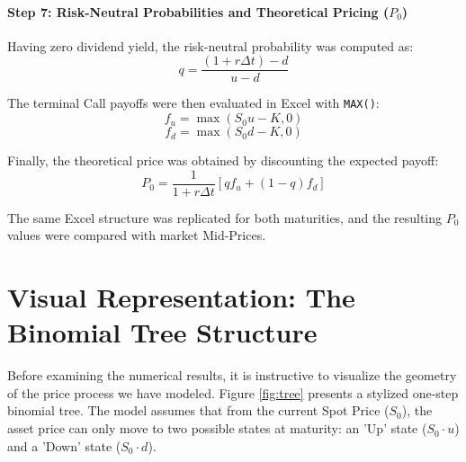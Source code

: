 \documentclass{report}
\begin{document}
\paragraph{Step 7: Risk-Neutral Probabilities and Theoretical Pricing ($P_0$)}
Having zero dividend yield, the risk-neutral probability was computed as:
$$ q = \frac{(1 + r\Delta t) - d}{u - d} $$

The terminal Call payoffs were then evaluated in Excel with \texttt{MAX()}:
$$ f_u = \max(S_0 u - K, 0) $$
$$ f_d = \max(S_0 d - K, 0) $$

Finally, the theoretical price was obtained by discounting the expected payoff:
$$ P_0 = \frac{1}{1 + r\Delta t} [q f_u + (1 - q) f_d] $$

The same Excel structure was replicated for both maturities, and the resulting $P_0$ values were compared with market Mid-Prices.

\section{Visual Representation: The Binomial Tree Structure}
Before examining the numerical results, it is instructive to visualize the geometry of the price process we have modeled. Figure \ref{fig:tree} presents a stylized one-step binomial tree. The model assumes that from the current Spot Price ($S_0$), the asset price can only move to two possible states at maturity: an 'Up' state ($S_0 \cdot u$) and a 'Down' state ($S_0 \cdot d$).
\end{document}
